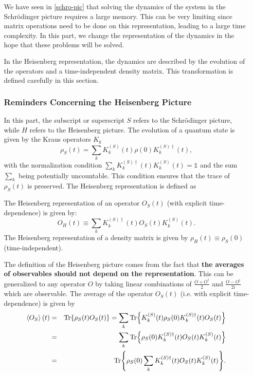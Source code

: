 We have seen in \autoref{schro-pic} that solving the dynamics of the system in the Schrödinger picture requires a large memory. This can be very limiting since matrix operations need to be done on this representation, leading to a large time complexity. In this part, we change the representation of the dynamics in the hope that these problems will be solved.

In the Heisenberg representation, the dynamics are described by the evolution of the operators and a time-independent density matrix. This transformation is defined carefully in this section.

\subsubsection{Reminders Concerning the Heisenberg Picture}

In this part, the subscript or superscript $S$ refers to the Schrödinger picture, while $H$ refers to the Heisenberg picture. The evolution of a quantum state is given by the Kraus operators $K_k$~\cite{explo_quant, green_bible}
\begin{equation}
    \rho_S(t) = \sum_{k} K^{(S)}_k(t) \rho(0) K^{(S) \dagger}_k(t),
\end{equation}
with the normalization condition $\sum_k K^{(S) \dagger}_k(t) K^{(S)}_k(t)  = \mathbb{1}$ and the sum $\sum_{k}$ being potentially uncountable. This condition ensures that the trace of $\rho_S(t)$ is preserved. The Heisenberg representation is defined as~\cite{stack_exch_prod}

\begin{definition}
    The Heisenberg representation of an operator $O_S(t)$ (with explicit time-dependence) is given by:
    \begin{equation}
        O_H(t) \equiv \sum_k K^{(S) \dagger}_k(t) O_S(t) K^{(S)}_k(t).
    \end{equation}
The Heisenberg representation of a density matrix is given by $\rho_H(t) \equiv \rho_S(0)$ (time-independent).
\end{definition}

The definition of the Heisenberg picture comes from the fact that \textbf{the averages of observables should not depend on the representation}. This can be generalized to any operator $O$ by taking linear combinations of $\frac{O+O^\dagger}{2}$ and $\frac{O-O^\dagger}{2i}$ which are observable. The average of the operator $O_S(t)$ (i.e. with explicit time-dependence) is given by
\begin{eqnarray}
    \left\langle O_S \right\rangle(t) &=& \Tr{\rho_S(t) O_S(t)} = \sum_k \Tr{K^{(S)}_k(t) \rho_S(0) K^{(S) \dagger}_k(t) O_S(t)} \nonumber\\
    &=& \sum_k \Tr{\rho_S(0) K^{(S) \dagger}_k(t) O_S(t) K^{(S)}_k(t)} \nonumber\\
    &=& \Tr{\rho_S(0) \sum_k K^{(S) \dagger}_k(t) O_S(t) K^{(S)}_k(t)}.
\end{eqnarray}

